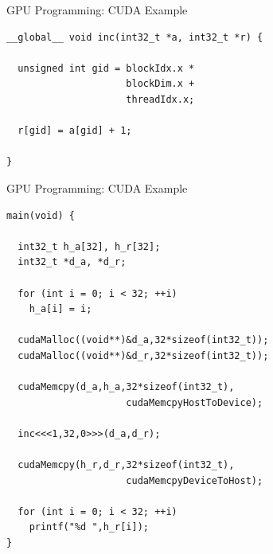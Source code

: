 \documentclass[xcolor=dvipsnames]{beamer}
\begin{document}
%
\begin{frame}[fragile]{GPU Programming: CUDA Example}

\begin{block}{}
\begin{verbatim} 
__global__ void inc(int32_t *a, int32_t *r) {
  
  unsigned int gid = blockIdx.x * 
                     blockDim.x + 
                     threadIdx.x;

  r[gid] = a[gid] + 1; 

} 
\end{verbatim}
\end{block} 


\end{frame} 

%
\begin{frame}[fragile]{GPU Programming: CUDA Example}

\begin{block}{}
\begin{tiny}
\begin{verbatim} 
main(void) {
  
  int32_t h_a[32], h_r[32]; 
  int32_t *d_a, *d_r;
  
  for (int i = 0; i < 32; ++i) 
    h_a[i] = i;

  cudaMalloc((void**)&d_a,32*sizeof(int32_t));
  cudaMalloc((void**)&d_r,32*sizeof(int32_t));

  cudaMemcpy(d_a,h_a,32*sizeof(int32_t),
                     cudaMemcpyHostToDevice);
  
  inc<<<1,32,0>>>(d_a,d_r); 

  cudaMemcpy(h_r,d_r,32*sizeof(int32_t),
                     cudaMemcpyDeviceToHost);

  for (int i = 0; i < 32; ++i) 
    printf("%d ",h_r[i]);
}
\end{verbatim}
\end{tiny}
\end{block} 
\end{frame} 
%
\end{document}
